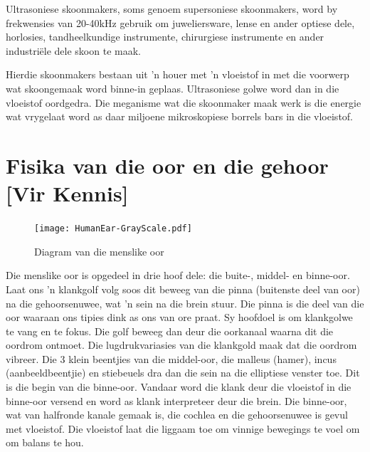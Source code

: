 Ultrasoniese skoonmakers, soms genoem supersoniese skoonmakers, word by frekwensies van 20-40kHz gebruik om juweliersware, lense en ander optiese dele, horlosies, tandheelkundige instrumente, chirurgiese instrumente en ander industri\"ele dele skoon te maak.

Hierdie skoonmakers bestaan uit 'n houer met 'n vloeistof in met die voorwerp wat skoongemaak word binne-in geplaas. Ultrasoniese golwe word dan in die vloeistof oordgedra. Die meganisme wat die skoonmaker maak werk is die energie wat vrygelaat word as daar miljoene mikroskopiese borrels bars in die vloeistof.\par
\label{m38800*notfhsst!!!underscore!!!id482}



\section*{Fisika van die oor en die gehoor [Vir Kennis]}
            \nopagebreak
\begin{figure}[H]
\begin{center}
\texttt{[image: HumanEar-GrayScale.pdf]}
\end{center}
\caption{Diagram van die menslike oor }
\label{Human Ear}
\end{figure}


Die menslike oor is opgedeel in drie hoof dele: die buite-, middel- en binne-oor. Laat ons 'n klankgolf volg soos dit beweeg van die pinna (buitenste deel van oor) na die gehoorsenuwee, wat 'n sein na die brein stuur. Die pinna is die deel van die oor waaraan ons tipies dink as ons van ore praat. Sy hoofdoel is om klankgolwe te vang en te fokus. Die golf beweeg dan deur die oorkanaal waarna dit die oordrom ontmoet. Die lugdrukvariasies van die klankgold maak dat die oordrom vibreer. Die 3 klein beentjies van die middel-oor, die malleus (hamer), incus (aanbeeldbeentjie) en stiebeuels dra dan die sein na die elliptiese venster toe. Dit is die begin van die binne-oor. Vandaar word die klank deur die vloeistof in die binne-oor versend en word as klank interpreteer deur die brein. Die binne-oor, wat van halfronde kanale gemaak is, die cochlea en die gehoorsenuwee is gevul met vloeistof. Die vloeistof laat die liggaam toe om vinnige bewegings te voel om om balans te hou.
\par

